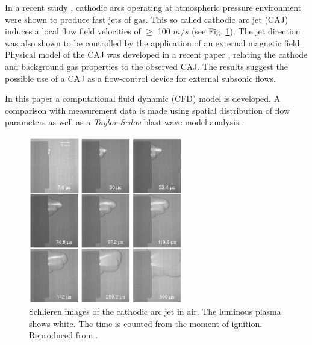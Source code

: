 \documentclass[a4paper]{iacas}%
\begin{document}
In a recent study \cite{KR}, cathodic arcs operating at atmospheric pressure environment were shown to produce fast jets of gas. This so called cathodic arc jet (CAJ) induces a local flow field velocities of $\ge$ 100 $m/s$ (see Fig. \ref{fig:CAJ}). The jet direction was also shown to be controlled by the application of an external magnetic field. Physical model of the CAJ was developed in a recent paper \cite{KRClose}, relating the cathode and background gas properties to the observed CAJ. The results suggest the possible use of a CAJ as a flow-control device for external subsonic flows\cite{KRFar}.

In this paper a computational fluid dynamic (CFD) model is developed. A comparison with measurement data is made using spatial distribution of flow parameters as well as a \emph{Taylor-Sedov} blast wave model analysis \cite{TAYLOR,SEDOV}.

\begin{figure}
	\centering
	\includegraphics[width=0.6\textwidth]{CAJ_highres.png}
	\caption{Schlieren images of the cathodic arc jet in air. The luminous plasma shows white. The time is counted from the moment of ignition. Reproduced from \cite{KR}.}
	\label{fig:CAJ}
\end{figure}
\end{document}
